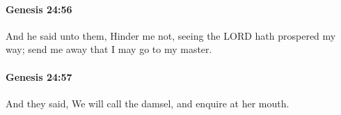 		\paragraph{Genesis 24:56} %
			\label{GENESIS-24-56}

			And he said unto them, Hinder me not, seeing the LORD hath prospered my way; send me away that I may go to my master.


		\paragraph{Genesis 24:57} %
			\label{GENESIS-24-57}

			And they said, We will call the damsel, and enquire at her mouth.


